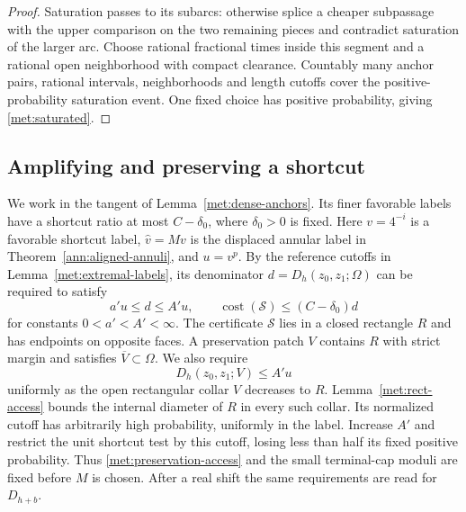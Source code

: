 \begin{proof}
Saturation passes to its subarcs: otherwise splice a cheaper
subpassage with the upper comparison on the two remaining pieces and
contradict saturation of the larger arc.  Choose rational fractional
times inside this segment and a rational open neighborhood with
compact clearance.  Countably many anchor pairs, rational intervals,
neighborhoods and length cutoffs cover the positive-probability
saturation event.  One fixed choice has positive probability, giving
\eqref{met:saturated}.
\end{proof}

\subsection{Amplifying and preserving a shortcut}

We work in the tangent of Lemma~\ref{met:dense-anchors}.  Its finer
favorable labels have a shortcut ratio at most $C-\delta_0$, where
$\delta_0>0$ is fixed.  Here $v=4^{-i}$ is a favorable shortcut label,
$\widehat v=Mv$ is the displaced annular label in
Theorem~\ref{ann:aligned-annuli}, and $u=v^p$.  By the
reference cutoffs in Lemma~\ref{met:extremal-labels}, its denominator
$d=D_{h}(z_0,z_1;\Omega)$ can be required to satisfy
\begin{equation}
 a'u\leq d\leq A'u,
 \qquad \operatorname{cost}(\mathcal S)\leq(C-\delta_0)d
 \label{met:shortcut}
\end{equation}
for constants $0<a'<A'<\infty$.  The certificate $\mathcal S$ lies in a
closed rectangle $R$ and has endpoints on opposite faces.  A
preservation patch $V$ contains $R$ with strict margin and satisfies
$\overline V\subset\Omega$.  We also require
\begin{equation}
 D_h(z_0,z_1;V)\leq A'u
 \label{met:preservation-access}
\end{equation}
uniformly as the open rectangular collar $V$ decreases to $R$.
Lemma~\ref{met:rect-access} bounds the internal diameter of $R$
in every such collar.  Its normalized cutoff has arbitrarily high
probability, uniformly in the label.  Increase $A'$ and restrict the
unit shortcut test by this cutoff, losing less than half its fixed
positive probability.  Thus \eqref{met:preservation-access} and the
small terminal-cap moduli are fixed before $M$ is chosen.  After a
real shift the same requirements are read for $D_{h+b}$.


